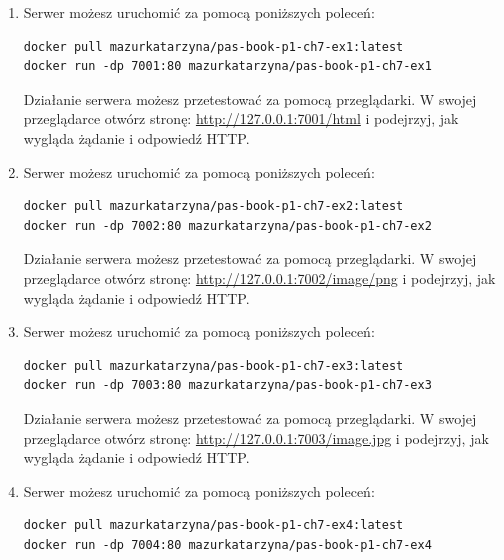 \begin{enumerate}[label=\textbf{7.\arabic*}]\setlength{\itemsep}{1em}
\item Serwer możesz uruchomić za pomocą poniższych poleceń:

\begin{verbatim}
docker pull mazurkatarzyna/pas-book-p1-ch7-ex1:latest
docker run -dp 7001:80 mazurkatarzyna/pas-book-p1-ch7-ex1
\end{verbatim}

\noindent Działanie serwera możesz przetestować za pomocą przeglądarki. W swojej przeglądarce otwórz stronę: \url{http://127.0.0.1:7001/html} i podejrzyj, jak wygląda żądanie i odpowiedź HTTP.

\item Serwer możesz uruchomić za pomocą poniższych poleceń:

\begin{verbatim}
docker pull mazurkatarzyna/pas-book-p1-ch7-ex2:latest
docker run -dp 7002:80 mazurkatarzyna/pas-book-p1-ch7-ex2
\end{verbatim}

\noindent Działanie serwera możesz przetestować za pomocą przeglądarki. W swojej przeglądarce otwórz stronę: \url{http://127.0.0.1:7002/image/png} i podejrzyj, jak wygląda żądanie i odpowiedź HTTP.

\item Serwer możesz uruchomić za pomocą poniższych poleceń:

\begin{verbatim}
docker pull mazurkatarzyna/pas-book-p1-ch7-ex3:latest
docker run -dp 7003:80 mazurkatarzyna/pas-book-p1-ch7-ex3
\end{verbatim}

\noindent Działanie serwera możesz przetestować za pomocą przeglądarki. W swojej przeglądarce otwórz stronę: \url{http://127.0.0.1:7003/image.jpg} i podejrzyj, jak wygląda żądanie i odpowiedź HTTP.

\item Serwer możesz uruchomić za pomocą poniższych poleceń:

\begin{verbatim}
docker pull mazurkatarzyna/pas-book-p1-ch7-ex4:latest
docker run -dp 7004:80 mazurkatarzyna/pas-book-p1-ch7-ex4
\end{verbatim}


\end{enumerate}
